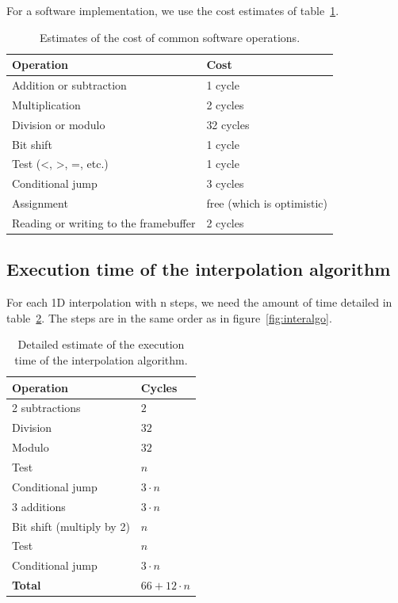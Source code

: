 \documentclass[a4paper,11pt]{kthesis}
\begin{document}
For a software implementation, we use the cost estimates of table~\ref{tab:swcost}.

\begin{table}
\centering
\begin{tabular}{|l|l|}
\hline
\textbf{Operation} & \textbf{Cost} \\
\hline
Addition or subtraction & 1 cycle \\
\hline
Multiplication & 2 cycles \\
\hline
Division or modulo & 32 cycles \\
\hline
Bit shift & 1 cycle \\
\hline
Test (<, >, =, etc.) & 1 cycle \\
\hline
Conditional jump & 3 cycles \\
\hline
Assignment & free (which is optimistic) \\
\hline
Reading or writing to the framebuffer & 2 cycles \\
\hline
\end{tabular}
\caption{Estimates of the cost of common software operations.}\label{tab:swcost}
\end{table}

\subsection{Execution time of the interpolation algorithm}
For each 1D interpolation with n steps, we need the amount of time detailed in table~\ref{tab:intertime}. The steps are in the same order as in figure~\ref{fig:interalgo}.

\begin{table}
\centering
\begin{tabular}{|l|l|}
\hline
\textbf{Operation} & \textbf{Cycles} \\
\hline
2 subtractions & $2$ \\
\hline
Division & $32$ \\
\hline
Modulo & $32$ \\
\hline
Test & $n$ \\
\hline
Conditional jump & $3 \cdot n$ \\
\hline
3 additions & $3 \cdot n$ \\
\hline
Bit shift (multiply by 2) & $n$ \\
\hline
Test & $n$ \\
\hline
Conditional jump & $3 \cdot n$ \\
\hline
\textbf{Total} & $66 + 12 \cdot n$ \\
\hline
\end{tabular}
\caption{Detailed estimate of the execution time of the interpolation algorithm.}\label{tab:intertime}
\end{table}
\end{document}
